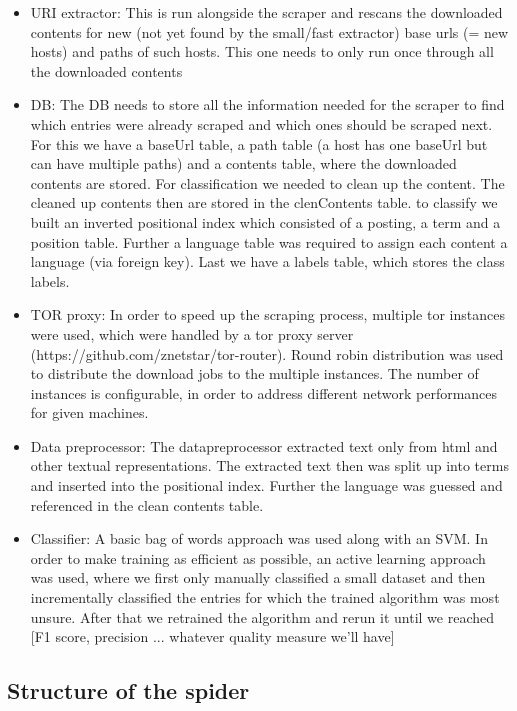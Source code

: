 \documentclass[USenglish,oneside,twocolumn]{article}
\begin{document}
\begin{itemize}
\begin{itemize}
    \end{itemize}
  \item URI extractor: This is run alongside the scraper and rescans the downloaded contents for new (not yet found by the small/fast extractor) base urls (= new hosts) and paths of such hosts. This one needs to only run once through all the downloaded contents
  \item DB: The DB needs to store all the information needed for the scraper to find which entries were already scraped and which ones should be scraped next. For this we have a baseUrl table, a path table (a host has one baseUrl but can have multiple paths) and a contents table, where the downloaded contents are stored. For classification we needed to clean up the content. The cleaned up contents then are stored in the clenContents table. to classify we built an inverted positional index which consisted of a posting, a term and a position table. Further a language table was required to assign each content a language (via foreign key). Last we have a labels table, which stores the class labels.
  \item TOR proxy: In order to speed up the scraping process, multiple tor instances were used, which were handled by a tor proxy server (https://github.com/znetstar/tor-router). Round robin distribution was used to distribute the download jobs to the multiple instances. The number of instances is configurable, in order to address different network performances for given machines.
  \item Data preprocessor: The datapreprocessor extracted text only from html and other textual representations. The extracted text then was split up into terms and inserted into the positional index. Further the language was guessed and referenced in the clean contents table.
  \item Classifier: A basic bag of words approach was used along with an SVM. In order to make training as efficient as possible, an active learning approach was used, where we first only manually classified a small dataset and then incrementally classified the entries for which the trained algorithm was most unsure. After that we retrained the algorithm and rerun it until we reached [F1 score, precision ... whatever quality measure we'll have]
\end{itemize}

\subsection{Structure of the spider}
\end{document}
